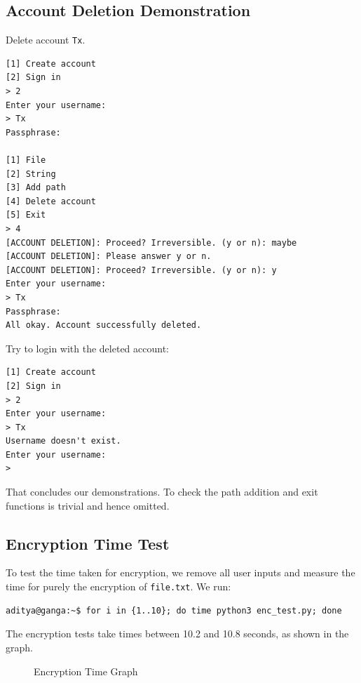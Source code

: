 \documentclass[titlepage]{article}
\begin{document}
\subsection{Account Deletion Demonstration}
Delete account \texttt{Tx}.
\begin{verbatim}
[1] Create account
[2] Sign in
> 2
Enter your username:
> Tx
Passphrase:

[1] File
[2] String
[3] Add path
[4] Delete account
[5] Exit
> 4
[ACCOUNT DELETION]: Proceed? Irreversible. (y or n): maybe
[ACCOUNT DELETION]: Please answer y or n.
[ACCOUNT DELETION]: Proceed? Irreversible. (y or n): y
Enter your username:
> Tx
Passphrase:
All okay. Account successfully deleted.
\end{verbatim}
Try to login with the deleted account:

\begin{verbatim}
[1] Create account
[2] Sign in
> 2
Enter your username:
> Tx
Username doesn't exist.
Enter your username:
>
\end{verbatim}
That concludes our demonstrations. To check the path addition and exit functions is trivial and
hence omitted.

\subsection{Encryption Time Test}
To test the time taken for encryption, we remove all user inputs and measure the time for purely the
encryption of \texttt{file.txt}. We run:

\begin{verbatim}
aditya@ganga:~$ for i in {1..10}; do time python3 enc_test.py; done
\end{verbatim}
The encryption tests take times between 10.2 and 10.8 seconds, as shown in the graph.\\[1cm]

\begin{figure}[h]
  \centering

  \caption{Encryption Time Graph}
\end{figure}
\end{document}
